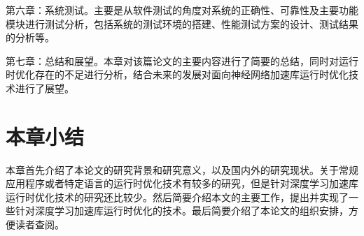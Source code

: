 第六章：系统测试。主要是从软件测试的角度对系统的正确性、可靠性及主要功能模块进行测试分析，包括系统的测试环境的搭建、性能测试方案的设计、测试结果的分析等。

第七章：总结和展望。本章对该篇论文的主要内容进行了简要的总结，同时对运行时优化存在的不足进行分析，结合未来的发展对面向神经网络加速库运行时优化技术进行了展望。

\section {本章小结}

本章首先介绍了本论文的研究背景和研究意义，以及国内外的研究现状。关于常规应用程序或者特定语言的运行时优化技术有较多的研究，但是针对深度学习加速库运行时优化技术的研究还比较少。然后简要介绍本文的主要工作，提出并实现了一些针对深度学习加速库运行时优化的技术。最后简要介绍了本论文的组织安排，方便读者查阅。